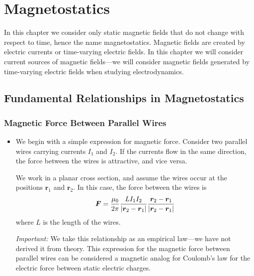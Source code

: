 \documentclass[11pt, a4paper]{article}
\renewcommand{\vec}[1]{\bm{#1}} %
\renewcommand{\r}{\vec{r}}
\newcommand{\mm}{\mu_{0}}  %
\begin{document}
\newpage
\section{Magnetostatics}
In this chapter we consider only static magnetic fields that do not change with respect to time, hence the name magnetostatics. Magnetic fields are created by electric currents or time-varying electric fields. In this chapter we will consider current sources of magnetic fields---we will consider magnetic fields generated by time-varying electric fields when studying electrodynamics.

\subsection{Fundamental Relationships in Magnetostatics}

\subsubsection{Magnetic Force Between Parallel Wires}
\begin{itemize}
	\item We begin with a simple expression for magnetic force. Consider two parallel wires carrying currents $ I_{1} $ and $ I_{2} $. If the currents flow in the same direction, the force between the wires is attractive, and vice versa.
	
	We work in a planar cross section, and assume the wires occur at the positions $ \r_{1} $ and $ \r_{2} $. In this case, the force between the wires is
	\begin{equation*}
		\vec{F} = \frac{\mm}{2\pi}\frac{LI_{1}I_{2}}{\abs{\r_{2}- \r_{1}}}\frac{\r_{2} - \r_{1}}{\abs{\r_{2} - \r_{1}}}
	\end{equation*}
	where $ L $ is the length of the wires. 

    \textit{Important:} We take this relationship as an empirical law---we have not derived it from theory. This expression for the magnetic force between parallel wires can be considered a magnetic analog for Coulomb's law for the electric force between static electric charges.
	
\end{itemize}
\end{document}
